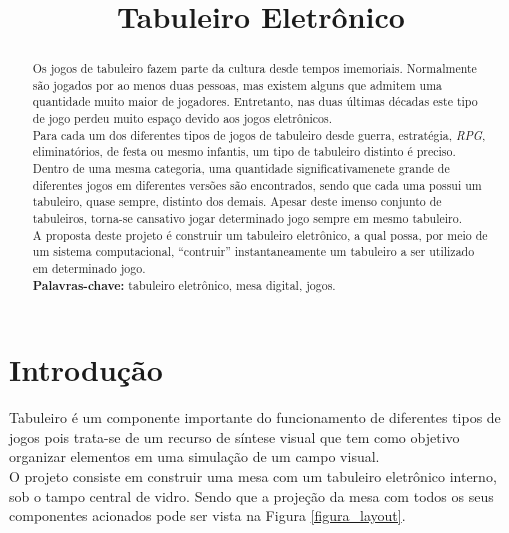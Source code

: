 \documentclass[a4paper,10pt]{article}
\title{Tabuleiro Eletrônico}
\author{}
\date{}
\begin{document}
\maketitle

\begin{abstract}
Os jogos de tabuleiro fazem parte da cultura desde tempos imemoriais. Normalmente são jogados por ao menos duas pessoas, mas existem alguns que admitem uma quantidade muito maior de jogadores. Entretanto, nas duas últimas décadas este tipo de jogo perdeu muito espaço devido aos jogos eletrônicos. \\ 

Para cada um dos diferentes tipos de jogos de tabuleiro desde guerra, estratégia, {\it RPG}, eliminatórios, de festa ou mesmo infantis, um tipo de tabuleiro distinto é preciso. Dentro de uma mesma categoria, uma quantidade significativamenete grande de diferentes jogos em diferentes versões são encontrados, sendo que cada uma possui um tabuleiro, quase sempre, distinto dos demais. Apesar deste imenso conjunto de tabuleiros, torna-se cansativo jogar determinado jogo sempre em mesmo tabuleiro. \\

A proposta deste projeto é construir um tabuleiro eletrônico, a qual possa, por meio de um sistema computacional, ``contruir'' instantaneamente um tabuleiro a ser utilizado em determinado jogo. \\

\noindent \textbf{Palavras-chave:} tabuleiro eletrônico, mesa digital, jogos.
\end{abstract}



\section{Introdução}
Tabuleiro é um componente importante do funcionamento de diferentes tipos de jogos pois trata-se de um recurso de síntese visual que tem como objetivo organizar elementos em uma simulação de um campo visual. \\

O projeto consiste em construir uma mesa com um tabuleiro eletrônico interno, sob o tampo central de vidro. Sendo que a projeção da mesa com todos os seus componentes acionados pode ser vista na Figura \ref{figura_layout}.  
\end{document}

